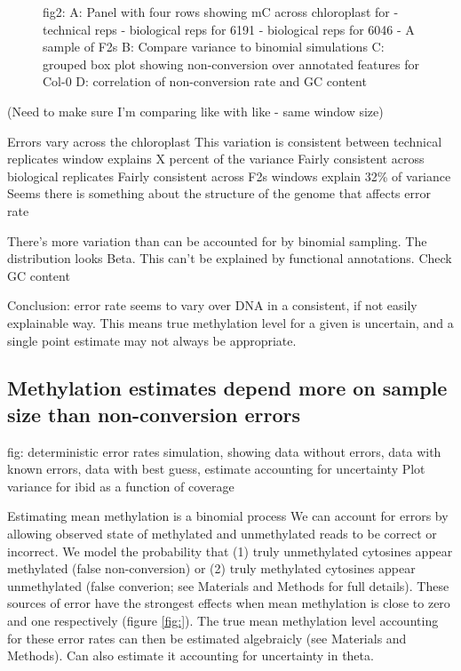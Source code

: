 \documentclass[12pt,longbibliography]{article}
\begin{document}
\begin{figure}
    fig2:
        A: Panel with four rows showing mC across chloroplast for
            - technical reps
            - biological reps for 6191
            - biological reps for 6046
            - A sample of F2s
        B: Compare variance to binomial simulations
        C: grouped box plot showing non-conversion over annotated features for Col-0
        D: correlation of non-conversion rate and GC content
\end{figure}

(Need to make sure I'm comparing like with like - same window size)

Errors vary across the chloroplast
This variation is consistent between technical replicates
    window explains X percent of the variance
Fairly consistent across biological replicates
Fairly consistent across F2s
    windows explain 32\% of variance
Seems there is something about the structure of the genome that affects error rate

There's more variation than can be accounted for by binomial sampling.
The distribution looks Beta.
This can't be explained by functional annotations.
Check GC content

Conclusion: error rate seems to vary over DNA in a consistent, if not easily explainable way.
This means true methylation level for a given is uncertain, and a single point estimate may not always be appropriate.

\subsection{Methylation estimates depend more on sample size than non-conversion errors}

fig:
    deterministic error rates
    simulation, showing data without errors, data with known errors, data with best guess, estimate accounting for uncertainty
    Plot variance for ibid as a function of coverage


Estimating mean methylation is a binomial process
We can account for errors by allowing observed state of methylated and unmethylated reads to be correct or incorrect.
We model the probability that (1) truly unmethylated cytosines appear methylated (false non-conversion) or (2) truly methylated cytosines appear unmethylated (false converion; see Materials and Methods for full details).
These sources of error have the strongest effects when mean methylation is close to zero and one respectively (figure \ref{fig:}).
The true mean methylation level accounting for these error rates can then be estimated algebraicly (see Materials and Methods).
Can also estimate it accounting for uncertainty in theta.
\end{document}
